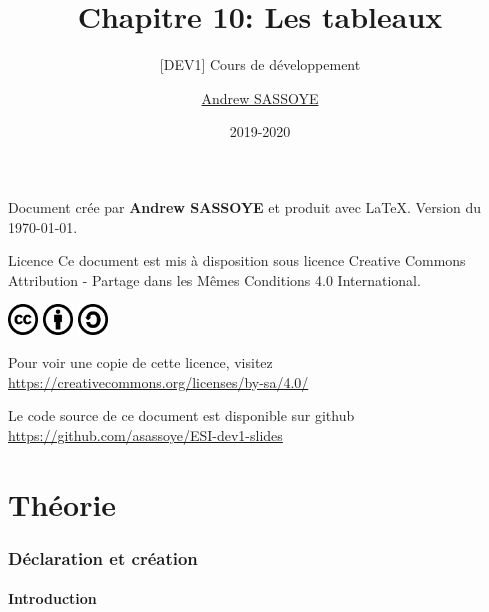 \documentclass{beamer}
\title{Chapitre 10: Les tableaux}
\subtitle{\tiny [DEV1] Cours de développement}
\author{\href{https://andrew.sassoye.be}{Andrew SASSOYE}}
\date{2019-2020}
\begin{document}
	\begin{frame}
		\titlepage
	\end{frame}

	\begin{frame}
        \center Document crée par \textbf{Andrew SASSOYE} et produit avec \LaTeX.
        \tiny Version du \today. \normalsize

		\begin{block}{Licence}
            Ce document est mis à disposition sous licence Creative Commons
            Attribution - Partage dans les Mêmes Conditions 4.0 International.

            \begin{center}
                \includegraphics[width=8mm]{./styles/images/cc}
                \includegraphics[width=8mm]{./styles/images/by}
                \includegraphics[width=8mm]{./styles/images/sa}
            \end{center}

            \center\tiny Pour voir une copie de cette licence, visitez
            \href{https://creativecommons.org/licenses/by-sa/4.0/}{https://creativecommons.org/licenses/by-sa/4.0/}
            \normalsize
        \end{block}

        \tiny Le code source de ce document est disponible sur github\\ \href{https://github.com/asassoye/ESI-dev1-slides}{https://github.com/asassoye/ESI-dev1-slides}

    \end{frame}

    \part{Théorie}

    \section{Déclaration et création}\label{sec:declaration-et-creation}
        \subsection{Introduction}\label{subsec:introduction}
            
\end{document}
